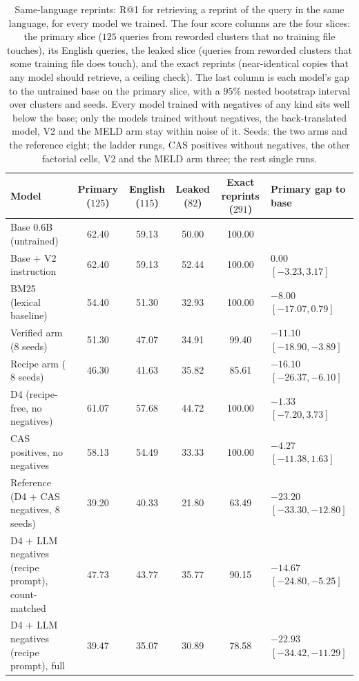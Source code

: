 \begin{table}[htbp]
\centering
\caption{Same-language reprints: R@1 for retrieving a reprint of the query in the same language, for every model we trained. The four score columns are the four slices: the primary slice ($125$ queries from reworded clusters that no training file touches), its English queries, the leaked slice (queries from reworded clusters that some training file does touch), and the exact reprints (near-identical copies that any model should retrieve, a ceiling check). The last column is each model's gap to the untrained base on the primary slice, with a $95\%$ nested bootstrap interval over clusters and seeds. Every model trained with negatives of any kind sits well below the base; only the models trained without negatives, the back-translated model, V2 and the MELD arm stay within noise of it. Seeds: the two arms and the reference eight; the ladder rungs, CAS positives without negatives, the other factorial cells, V2 and the MELD arm three; the rest single runs.}
\label{tab:samelang}
\scriptsize
\setlength{\tabcolsep}{2pt}
\begin{tabular}{@{}p{3.7cm}cccc>{\centering\arraybackslash}p{3.1cm}@{}}
\toprule
Model & Primary ($125$) & English ($115$) & Leaked ($82$) & Exact reprints ($291$) & Primary gap to base \\
\midrule
Base $0.6$B (untrained) & 62.40 & 59.13 & 50.00 & 100.00 & \\
Base $+$ V2 instruction & 62.40 & 59.13 & 52.44 & 100.00 & $0.00$ $[-3.23, 3.17]$ \\
BM25 (lexical baseline) & 54.40 & 51.30 & 32.93 & 100.00 & $-8.00$ $[-17.07, 0.79]$ \\
Verified arm ($8$ seeds) & 51.30 & 47.07 & 34.91 & 99.40 & $-11.10$ $[-18.90, -3.89]$ \\
Recipe arm ($8$ seeds) & 46.30 & 41.63 & 35.82 & 85.61 & $-16.10$ $[-26.37, -6.10]$ \\
D4 (recipe-free, no negatives) & 61.07 & 57.68 & 44.72 & 100.00 & $-1.33$ $[-7.20, 3.73]$ \\
CAS positives, no negatives & 58.13 & 54.49 & 33.33 & 100.00 & $-4.27$ $[-11.38, 1.63]$ \\
Reference (D4 $+$ CAS negatives, $8$ seeds) & 39.20 & 40.33 & 21.80 & 63.49 & $-23.20$ $[-33.30, -12.80]$ \\
D4 $+$ LLM negatives (recipe prompt), count-matched & 47.73 & 43.77 & 35.77 & 90.15 & $-14.67$ $[-24.80, -5.25]$ \\
D4 $+$ LLM negatives (recipe prompt), full & 39.47 & 35.07 & 30.89 & 78.58 & $-22.93$ $[-34.42, -11.29]$ \\

\end{tabular}
\end{table}

